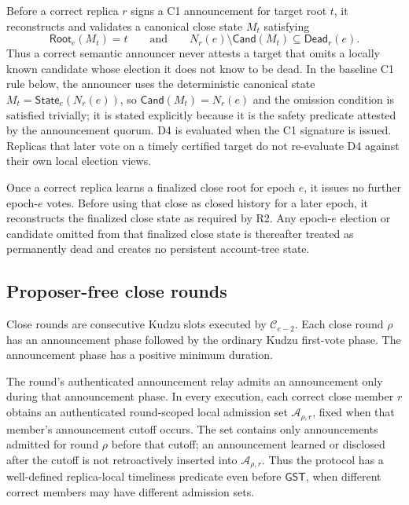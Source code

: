 \documentclass[11pt]{article}
\theoremstyle{definition}
\theoremstyle{remark}
\newcommand{\C}{\mathcal C}
\newcommand{\GST}{\mathsf{GST}}
\newcommand{\Root}{\mathsf{Root}}
\newcommand{\State}{\mathsf{State}}
\newcommand{\Cand}{\mathsf{Cand}}
\newcommand{\Dead}{\mathsf{Dead}}
\begin{document}
\begin{description}[leftmargin=2.4em,labelindent=0em]
\item[D4 (semantic target safety).]
Before a correct replica $r$ signs a C1 announcement for target root $t$, it reconstructs and validates a canonical close state $M_t$ satisfying
\begin{equation}
  \Root_e(M_t)=t
  \qquad\text{and}\qquad
  N_r(e)\setminus\Cand(M_t)\subseteq\Dead_r(e).
  \label{eq:d4}
\end{equation}
Thus a correct semantic announcer never attests a target that omits a locally known candidate whose election it does not know to be dead. In the baseline C1 rule below, the announcer uses the deterministic canonical state $M_t=\State_e(N_r(e))$, so $\Cand(M_t)=N_r(e)$ and the omission condition is satisfied trivially; it is stated explicitly because it is the safety predicate attested by the announcement quorum. D4 is evaluated when the C1 signature is issued. Replicas that later vote on a timely certified target do not re-evaluate D4 against their own local election views.

\item[D5 (post-close fence).]
Once a correct replica learns a finalized close root for epoch $e$, it issues no further epoch-$e$ votes. Before using that close as closed history for a later epoch, it reconstructs the finalized close state as required by R2. Any epoch-$e$ election or candidate omitted from that finalized close state is thereafter treated as permanently dead and creates no persistent account-tree state.
\end{description}

\subsection{Proposer-free close rounds}

Close rounds are consecutive Kudzu slots executed by $\C_{e-2}$. Each close round $\rho$ has an announcement phase followed by the ordinary Kudzu first-vote phase. The announcement phase has a positive minimum duration.

The round's authenticated announcement relay admits an announcement only during that announcement phase. In every execution, each correct close member $r$ obtains an authenticated round-scoped local admission set $\mathcal A_{\rho,r}$, fixed when that member's announcement cutoff occurs. The set contains only announcements admitted for round $\rho$ before that cutoff; an announcement learned or disclosed after the cutoff is not retroactively inserted into $\mathcal A_{\rho,r}$. Thus the protocol has a well-defined replica-local timeliness predicate even before $\GST$, when different correct members may have different admission sets.
\end{document}
